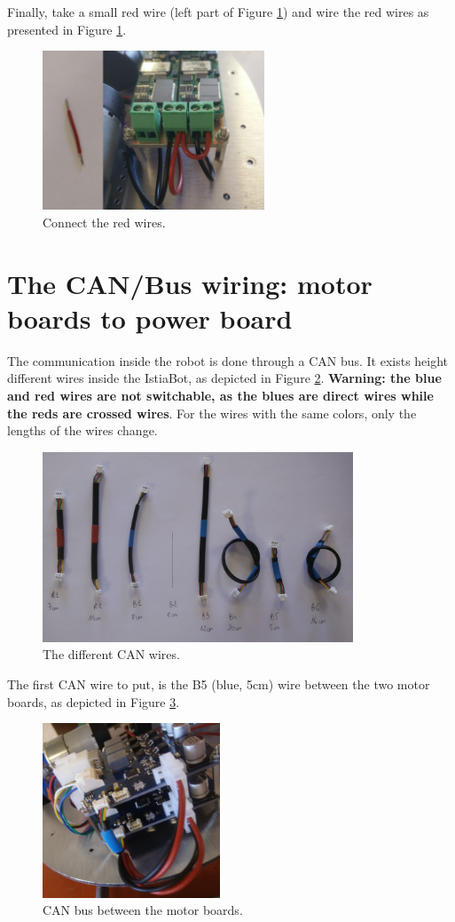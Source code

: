\documentclass[10pt,a4paper]{report}   %
\begin{document}
 Finally, take a small red wire (left part of Figure \ref{fig:32}) and wire the red wires as presented in Figure \ref{fig:32}.

\begin{figure}[H]
\center
\includegraphics[width=250px]{images/32.jpg}
\caption{Connect the red wires.}
\label{fig:32}
\end{figure}

\section{The CAN/Bus wiring: motor boards to power board}

The communication inside the robot is done through a CAN bus. It exists height different wires inside the IstiaBot, as depicted in Figure \ref{fig:33}. \textbf{Warning: the blue and red wires are not switchable, as the blues are direct wires while the reds are crossed wires}. For the wires with the same colors, only the lengths of the wires change.

\begin{figure}[H]
\center
\includegraphics[width=350px]{images/33.jpg}
\caption{The different CAN wires.}
\label{fig:33}
\end{figure}

The first CAN wire to put, is the B5 (blue, 5cm) wire between the two motor boards, as depicted in Figure \ref{fig:34}.

\begin{figure}[H]
\center
\includegraphics[width=200px]{images/34.jpg}
\caption{CAN bus between the motor boards.}
\label{fig:34}
\end{figure}
\end{document}
